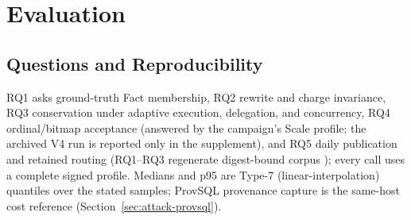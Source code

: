 \documentclass[10pt,journal,compsoc]{IEEEtran}
\begin{document}
\section{Evaluation}
\label{sec:evaluation}

\subsection{Questions and Reproducibility}

RQ1 asks ground-truth Fact membership, RQ2 rewrite and charge invariance,
RQ3 conservation under adaptive execution, delegation, and concurrency, RQ4
ordinal/bitmap acceptance (answered by the campaign's Scale profile; the
archived V4 run is reported only in the supplement), and RQ5 daily
publication and retained routing
(RQ1--RQ3 regenerate digest-bound corpus \ExposureCorpusHash{}); every call
uses a complete signed profile. Medians and p95 are Type-7
(linear-interpolation) quantiles \cite{hyndman1996quantiles} over the
stated samples; ProvSQL
provenance capture is the same-host cost reference
(Section~\ref{sec:attack-provsql}).
\end{document}
